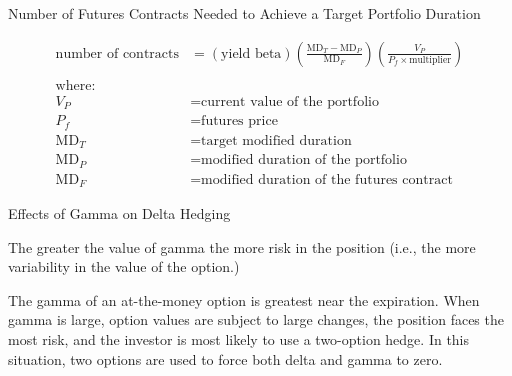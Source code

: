 \documentclass[../custom]{flashcards}
\begin{document}
\begin{flashcard}[\studyArea]{Number of Futures Contracts Needed to Achieve a Target Portfolio Duration}
    \begin{flushleft}
        \begin{align*}
            \text{number of contracts} &= (\text{yield beta}) \left ( \frac{\text{MD}_T - \text{MD}_P}{\text{MD}_F} \right ) \left ( \frac{V_P}{P_f \times \text{multiplier}} \right )\\
            \\
            \text{where:}\\
            V_P &= \text{current value of the portfolio}\\
            P_f &= \text{futures price}\\
            \text{MD}_T &= \text{target modified duration}\\
            \text{MD}_P &= \text{modified duration of the portfolio}\\
            \text{MD}_F &= \text{modified duration of the futures contract}
        \end{align*}
    \end{flushleft}
\end{flashcard}

\begin{flashcard}[\studyArea]{Effects of Gamma on Delta Hedging}
    \begin{flushleft}
        The greater the value of gamma the more risk in the position (i.e., the more variability in the value of the option.)\newline

        The gamma of an at-the-money option is greatest near the expiration. When gamma is large, option values are subject to large changes, the position faces the most risk, and the investor is most likely to use a two-option hedge. In this situation, two options are used to force both delta and gamma to zero.
    \end{flushleft}
\end{flashcard}
\end{document}
